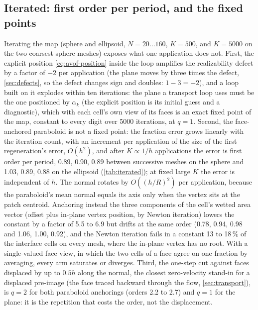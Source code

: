 \documentclass[preprint,12pt]{elsarticle}
\begin{document}
\subsection{Iterated: first order per period, and the fixed points}

Iterating the map (sphere and ellipsoid, $N = 20 \ldots 160$, $K = 500$, and $K = 5000$ on the two coarsest sphere meshes) exposes what one application does not. First, the explicit position \cref{eq:avof-position} inside the loop amplifies the realizability defect by a factor of $-2$ per application (the plane moves by three times the defect, \cref{sec:defects}, so the defect changes sign and doubles: $1 - 3 = -2$), and a loop built on it explodes within ten iterations: the plane a transport loop uses must be the one positioned by $\alpha_k$ (the explicit position is its initial guess and a diagnostic), which with each cell's own view of its faces is an exact fixed point of the map, constant to every digit over 5000 iterations, at $q = 1$. Second, the face-anchored paraboloid is not a fixed point: the fraction error grows linearly with the iteration count, with an increment per application of the size of the first regeneration's error, $O(h^2)$, and after $K \propto 1/h$ applications the error is first order per period, 0.89, 0.90, 0.89 between successive meshes on the sphere and 1.03, 0.89, 0.88 on the ellipsoid (\cref{tab:iterated}); at fixed large $K$ the error is independent of $h$. The normal rotates by $O((h/R)^2)$ per application, because the paraboloid's mean normal equals its axis only when the vertex sits at the patch centroid. Anchoring instead the three components of the cell's wetted area vector (offset plus in-plane vertex position, by Newton iteration) lowers the constant by a factor of 5.5 to 6.9 but drifts at the same order (0.78, 0.94, 0.98 and 1.06, 1.00, 0.92), and the Newton iteration fails in a constant 13 to 18\,\% of the interface cells on every mesh, where the in-plane vertex has no root. With a single-valued face view, in which the two cells of a face agree on one fraction by averaging, every arm saturates or diverges. Third, the one-step cut against faces displaced by up to $0.5h$ along the normal, the closest zero-velocity stand-in for a displaced pre-image (the face traced backward through the flow, \cref{sec:transport}), is $q = 2$ for both paraboloid anchorings (orders 2.2 to 2.7) and $q = 1$ for the plane: it is the repetition that costs the order, not the displacement.
\end{document}
